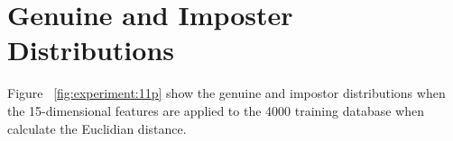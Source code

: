 \section{Genuine and Imposter Distributions}
\label{sec:experiment:distribution}


Figure ~\ref{fig:experiment:11p} show the genuine and impostor distributions when the 15-dimensional features are applied to the 4000 training database when calculate the Euclidian distance.

% 
% 
% 
% 
